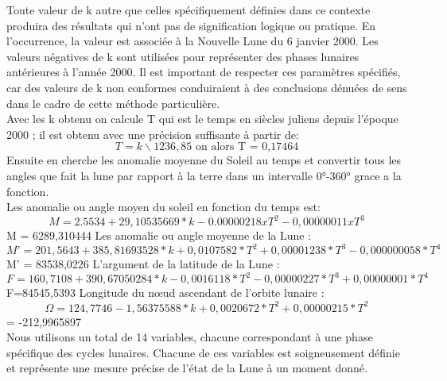 Toute valeur de k autre que celles spécifiquement définies dans ce contexte produira des résultats qui n'ont pas de signification logique ou pratique. En l'occurrence, la valeur est associée à la Nouvelle Lune du 6 janvier 2000. Les valeurs négatives de k sont utilisées pour représenter des phases lunaires antérieures à l'année 2000. Il est important de respecter ces paramètres spécifiés, car des valeurs de k non conformes conduiraient à des conclusions dénuées de sens dans le cadre de cette méthode particulière.\\
Avec les k obtenu on calcule T qui est le temps en siècles juliens depuis l'époque 2000 ; il est obtenu avec une précision suffisante à partir de:
\[T =k \backslash 1236,85  \text{  on alors T = 0,17464}\]
Ensuite en cherche les anomalie moyenne du Soleil au temps et convertir tous les angles que fait la lune par rapport à la terre dans un intervalle 0°-360° grace a la fonction.\\
Les anomalie ou angle moyen du soleil en fonction du temps est:
\[M = 2.5534 + 29,10535669 * k - 0.00000218 x T^{2} - 0,00000011 x T^{3} \]
M = 6289,310444	
Les anomalie ou angle moyenne de la Lune :
\[M’ = 201,5643 + 385,81693528 * k + 0,0107582 * T^{2}+ 0,00001238 * T^{3}- 0,000000058 * T^{4}\]
M' = 83538,0226
L'argument de la latitude de la Lune :
\[F = 160,7108 + 390,67050284 * k - 0,0016118 * T^{2}- 0,00000227 * T^{3}+ 0,00000001 * T^{4}\]
F=84545,5393
Longitude du nœud ascendant de l'orbite lunaire :	
\[\Omega= 124,7746 - 1,56375588  *k + 0,0020672 * T^{2}+ 0,00000215 * T^{2}\]
\Omega = -212,9965897\\
Nous utilisons un total de 14 variables, chacune correspondant à une phase spécifique des cycles lunaires. Chacune de ces variables est soigneusement définie et représente une mesure précise de l'état de la Lune à un moment donné. \\
